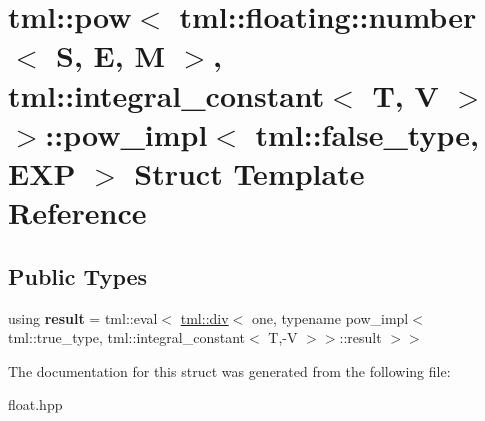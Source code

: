\hypertarget{structtml_1_1pow_3_01tml_1_1floating_1_1number_3_01S_00_01E_00_01M_01_4_00_01tml_1_1integral__co391b9c019061240dafa8457ab56fcf00}{\section{tml\+:\+:pow$<$ tml\+:\+:floating\+:\+:number$<$ S, E, M $>$, tml\+:\+:integral\+\_\+constant$<$ T, V $>$ $>$\+:\+:pow\+\_\+impl$<$ tml\+:\+:false\+\_\+type, E\+X\+P $>$ Struct Template Reference}
\label{structtml_1_1pow_3_01tml_1_1floating_1_1number_3_01S_00_01E_00_01M_01_4_00_01tml_1_1integral__co391b9c019061240dafa8457ab56fcf00}
}
\subsection*{Public Types}
\begin{DoxyCompactItemize}
\item 
\hypertarget{structtml_1_1pow_3_01tml_1_1floating_1_1number_3_01S_00_01E_00_01M_01_4_00_01tml_1_1integral__co391b9c019061240dafa8457ab56fcf00_afcabc1e846556a5df62e5da0d8cb51c2}{using {\bfseries result} = tml\+::eval$<$ \hyperlink{structtml_1_1div}{tml\+::div}$<$ one, typename pow\+\_\+impl$<$ tml\+::true\+\_\+type, tml\+::integral\+\_\+constant$<$ T,-\/V $>$$>$\+::result $>$$>$}\label{structtml_1_1pow_3_01tml_1_1floating_1_1number_3_01S_00_01E_00_01M_01_4_00_01tml_1_1integral__co391b9c019061240dafa8457ab56fcf00_afcabc1e846556a5df62e5da0d8cb51c2}

\end{DoxyCompactItemize}


The documentation for this struct was generated from the following file\+:\begin{DoxyCompactItemize}
\item 
float.\+hpp\end{DoxyCompactItemize}
